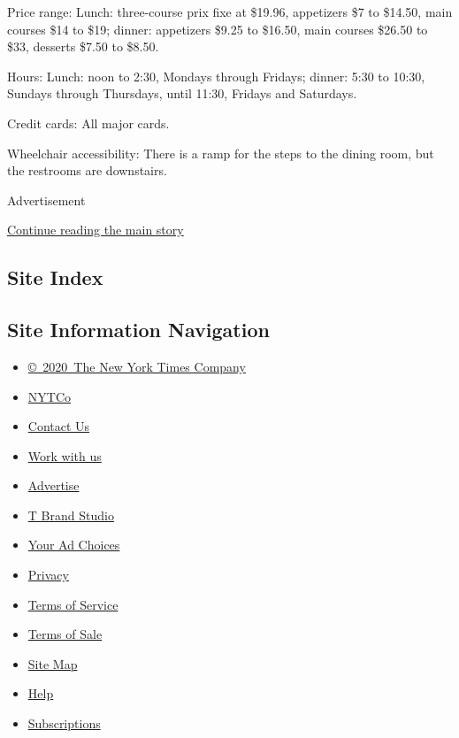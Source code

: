 Price range: Lunch: three-course prix fixe at \$19.96, appetizers \$7 to
\$14.50, main courses \$14 to \$19; dinner: appetizers \$9.25 to
\$16.50, main courses \$26.50 to \$33, desserts \$7.50 to \$8.50.

Hours: Lunch: noon to 2:30, Mondays through Fridays; dinner: 5:30 to
10:30, Sundays through Thursdays, until 11:30, Fridays and Saturdays.

Credit cards: All major cards.

Wheelchair accessibility: There is a ramp for the steps to the dining
room, but the restrooms are downstairs.

Advertisement

\protect\hyperlink{after-bottom}{Continue reading the main story}

\hypertarget{site-index}{%
\subsection{Site Index}\label{site-index}}

\hypertarget{site-information-navigation}{%
\subsection{Site Information
Navigation}\label{site-information-navigation}}

\begin{itemize}
\tightlist
\item
  \href{https://help.nytimes3xbfgragh.onion/hc/en-us/articles/115014792127-Copyright-notice}{©~2020~The
  New York Times Company}
\end{itemize}

\begin{itemize}
\tightlist
\item
  \href{https://www.nytco.com/}{NYTCo}
\item
  \href{https://help.nytimes3xbfgragh.onion/hc/en-us/articles/115015385887-Contact-Us}{Contact
  Us}
\item
  \href{https://www.nytco.com/careers/}{Work with us}
\item
  \href{https://nytmediakit.com/}{Advertise}
\item
  \href{http://www.tbrandstudio.com/}{T Brand Studio}
\item
  \href{https://www.nytimes3xbfgragh.onion/privacy/cookie-policy\#how-do-i-manage-trackers}{Your
  Ad Choices}
\item
  \href{https://www.nytimes3xbfgragh.onion/privacy}{Privacy}
\item
  \href{https://help.nytimes3xbfgragh.onion/hc/en-us/articles/115014893428-Terms-of-service}{Terms
  of Service}
\item
  \href{https://help.nytimes3xbfgragh.onion/hc/en-us/articles/115014893968-Terms-of-sale}{Terms
  of Sale}
\item
  \href{https://spiderbites.nytimes3xbfgragh.onion}{Site Map}
\item
  \href{https://help.nytimes3xbfgragh.onion/hc/en-us}{Help}
\item
  \href{https://www.nytimes3xbfgragh.onion/subscription?campaignId=37WXW}{Subscriptions}
\end{itemize}
